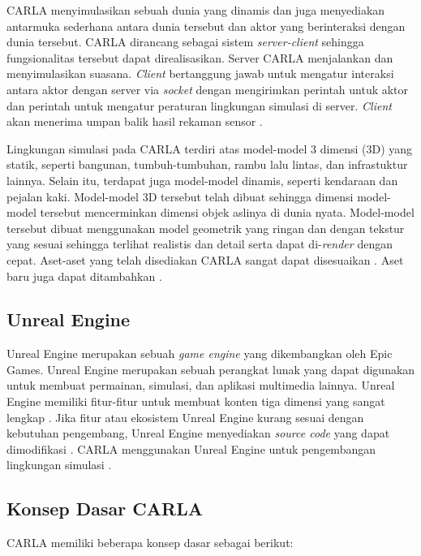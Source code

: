 CARLA menyimulasikan sebuah dunia yang dinamis dan juga menyediakan antarmuka
sederhana antara dunia tersebut dan aktor yang berinteraksi dengan dunia
tersebut. CARLA dirancang sebagai sistem \textit{server-client} sehingga
fungsionalitas tersebut dapat direalisasikan. Server CARLA menjalankan dan
menyimulasikan suasana. \textit{Client} bertanggung jawab untuk mengatur
interaksi antara aktor dengan server via \textit{socket} dengan mengirimkan
perintah untuk aktor dan perintah untuk mengatur peraturan lingkungan simulasi
di server. \textit{Client} akan menerima umpan balik hasil rekaman sensor
\parencite{carla-dosovitskiy}.

Lingkungan simulasi pada CARLA terdiri atas model-model 3 dimensi (3D) yang
statik, seperti bangunan, tumbuh-tumbuhan, rambu lalu lintas, dan infrastuktur
lainnya. Selain itu, terdapat juga model-model dinamis, seperti kendaraan dan
pejalan kaki. Model-model 3D tersebut telah dibuat sehingga dimensi model-model
tersebut mencerminkan dimensi objek aslinya di dunia nyata. Model-model tersebut
dibuat menggunakan model geometrik yang ringan dan dengan tekstur yang sesuai
sehingga terlihat realistis dan detail serta dapat di-\textit{render} dengan
cepat. Aset-aset yang telah disediakan CARLA sangat dapat disesuaikan
\parencite{carla-dosovitskiy}. Aset baru juga dapat ditambahkan
\parencite{carla-documentation}.

\subsection{Unreal Engine}

Unreal Engine merupakan sebuah \textit{game engine} yang dikembangkan oleh Epic
Games. Unreal Engine merupakan sebuah perangkat lunak yang dapat digunakan untuk
membuat permainan, simulasi, dan aplikasi multimedia lainnya. Unreal Engine
memiliki fitur-fitur untuk membuat konten tiga dimensi yang sangat lengkap
\parencite{ue-5}. Jika fitur atau ekosistem Unreal Engine kurang sesuai dengan
kebutuhan pengembang, Unreal Engine menyediakan \textit{source code} yang dapat
dimodifikasi \parencite{ue-4}. CARLA menggunakan Unreal Engine untuk
pengembangan lingkungan simulasi \parencite{carla-documentation}.

\subsection{Konsep Dasar CARLA \parencite{carla-documentation}}

CARLA memiliki beberapa konsep dasar sebagai berikut:


